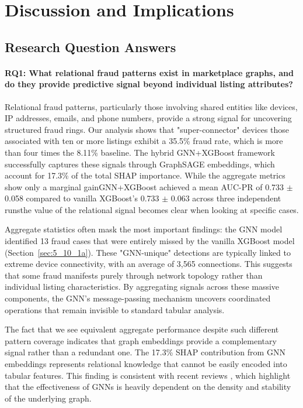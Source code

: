 \section{Discussion and Implications}
\label{sec:5_10}

\subsection{Research Question Answers}
\label{sec:5_10_1}

\paragraph{RQ1: What relational fraud patterns exist in marketplace graphs, and do they provide predictive signal beyond individual listing attributes?}

Relational fraud patterns, particularly those involving shared entities like devices, IP addresses, emails, and phone numbers, provide a strong signal for uncovering structured fraud rings. Our analysis shows that "super-connector" devices those associated with ten or more listings exhibit a 35.5\% fraud rate, which is more than four times the 8.11\% baseline. The hybrid GNN+XGBoost framework successfully captures these signals through GraphSAGE embeddings, which account for 17.3\% of the total SHAP importance. While the aggregate metrics show only a marginal gainGNN+XGBoost achieved a mean AUC-PR of 0.733 $\pm$ 0.058 compared to vanilla XGBoost's 0.733 $\pm$ 0.063 across three independent runsthe value of the relational signal becomes clear when looking at specific cases.

Aggregate statistics often mask the most important findings: the GNN model identified 13 fraud cases that were entirely missed by the vanilla XGBoost model (Section~\ref{sec:5_10_1a}). These "GNN-unique" detections are typically linked to extreme device connectivity, with an average of 3,565 connections. This suggests that some fraud manifests purely through network topology rather than individual listing characteristics. By aggregating signals across these massive components, the GNN's message-passing mechanism uncovers coordinated operations that remain invisible to standard tabular analysis.

The fact that we see equivalent aggregate performance despite such different pattern coverage indicates that graph embeddings provide a complementary signal rather than a redundant one. The 17.3\% SHAP contribution from GNN embeddings represents relational knowledge that cannot be easily encoded into tabular features. This finding is consistent with recent reviews \cite{motie2024financial}, which highlight that the effectiveness of GNNs is heavily dependent on the density and stability of the underlying graph.

